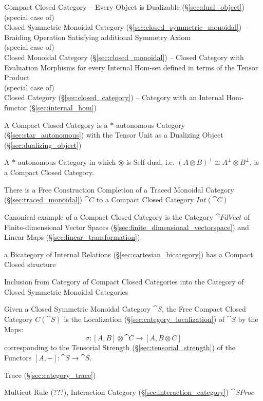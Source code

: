 Compact Closed Category -- Every Object is Dualizable
(\S\ref{sec:dual_object}) \\
(special case of) \\
Closed Symmetric Monoidal Category
(\S\ref{sec:closed_symmetric_monoidal})
-- Braiding Operation Satisfying additional Symmetry Axiom \\
(special case of) \\
Closed Monoidal Category (\S\ref{sec:closed_monoidal}) -- Closed
Category with Evaluation Morphisms for every Internal Hom-set defined
in terms of the Tensor Product \\
(special case of) \\
Closed Category (\S\ref{sec:closed_category}) -- Category with an
Internal Hom-functor (\S\ref{sec:internal_hom})

A Compact Closed Category is a $*$-autonomous Category
(\S\ref{sec:star_autonomous}) with the Tensor Unit as a Dualizing
Object (\S\ref{sec:dualizing_object})

A $*$-autonomous Category in which $\otimes$ is Self-dual, i.e. $(A
\otimes B)^\bot \cong A^\bot \otimes B^\bot$, is a Compact Closed
Category. \cite{abramsky-gay-nagarajan96}

There is a Free Construction Completion of a Traced Monoidal Category
(\S\ref{sec:traced_monoidal}) $\cat{C}$ to a Compact Closed Category
$Int(\cat{C})$

Canonical example of a Compact Closed Category is the Category
$\cat{FdVect}$ of Finite-dimensional Vector Spaces
(\S\ref{sec:finite_dimensional_vectorspace}) and Linear Maps
(\S\ref{sec:linear_transformation}).

a Bicategory of Internal Relations (\S\ref{sec:cartesian_bicategory}) has a
Compact Closed structure

Inclusion from Category of Compact Closed Categories into the Category
of Closed Symmetric Monoidal Categories

Given a Closed Symmetric Monoidal Category $\cat{S}$, the Free Compact
Closed Category $C(\cat{S})$ is the Localization
(\S\ref{sec:category_localization}) of $\cat{S}$ by the Maps:
\[
  \sigma:[A,B] \otimes \cat{C} \rightarrow [A,B \otimes C]
\]
corresponding to the Tensorial Strength
(\S\ref{sec:tensorial_strength}) of the Functors $[A,-]: \cat{S}
\rightarrow \cat{S}$.

Trace (\S\ref{sec:category_trace})

Multicut Rule (???), Interaction Category
(\S\ref{sec:interaction_category}) $\cat{SProc}$

